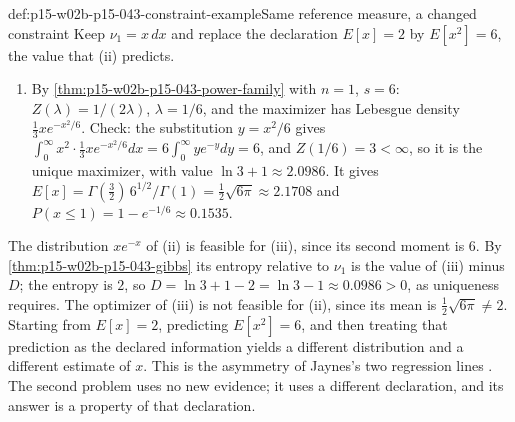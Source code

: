 \begin{hbexample}{def:p15-w02b-p15-043-constraint-example}{Same reference measure, a changed constraint}
Keep \(\nu_1=x\,dx\) and replace the declaration \(E[x]=2\) by
\(E[x^2]=6\), the value that (ii) predicts.
\begin{enumerate}
\item[(iii)] By \cref{thm:p15-w02b-p15-043-power-family} with \(n=1\), \(s=6\):
\(Z(\lambda)=1/(2\lambda)\), \(\lambda=1/6\), and the maximizer has Lebesgue
density \(\tfrac13xe^{-x^2/6}\). Check: the substitution \(y=x^2/6\) gives
\(\int_0^\infty x^2\cdot\tfrac13xe^{-x^2/6}dx=6\int_0^\infty ye^{-y}dy=6\), and
\(Z(1/6)=3<\infty\), so it is the unique maximizer, with value
\(\ln3+1\approx2.0986\).
It gives \(E[x]=\Gamma(\tfrac32)\,6^{1/2}/\Gamma(1)=\tfrac12\sqrt{6\pi}\approx2.1708\)
and \(P(x\leq1)=1-e^{-1/6}\approx0.1535\).
\end{enumerate}
The distribution \(xe^{-x}\) of (ii) is feasible for (iii), since its second
moment is \(6\). By \cref{thm:p15-w02b-p15-043-gibbs} its entropy relative to
\(\nu_1\) is the value of (iii) minus \(D\); the entropy is \(2\), so
\(D=\ln3+1-2=\ln3-1\approx0.0986>0\), as uniqueness requires.
The optimizer of (iii) is not feasible for (ii), since its mean is
\(\tfrac12\sqrt{6\pi}\neq2\). Starting from \(E[x]=2\), predicting \(E[x^2]=6\), and
then treating that prediction as the declared information yields a different
distribution and a different estimate of \(x\). This is the asymmetry of
Jaynes's two regression lines \cite[pp.~625--626, Fig.~1]{Jaynes1957InformationTheory}.
The second problem uses no new evidence; it uses a different declaration,
and its answer is a property of that declaration.
\end{hbexample}

